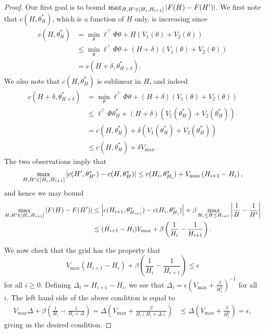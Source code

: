 \documentclass[11pt]{article}
\begin{document}
\begin{proof}
  Our first goal is to bound $\max_{H, H'\in [H_i, H_{i+1}]} \left\vert F(H) - F(H')\right\vert$. We first note that $c(H,\theta^*_H)$, which is a function of $H$ only, is increasing since 
\begin{align*}
  c(H,\theta^*_H)
  & =
    \min_{\theta}\ell^\top\Phi\theta + H(V_1(\theta)+V_2(\theta))\\
  &\leq
    \min_{\theta}\ell^\top\Phi\theta + (H+\delta)(V_1(\theta)+V_2(\theta))\\
  &=
  c(H+\delta,\theta^*_{H+\delta}).
\end{align*}
We also note that $c(H,\theta^*_H)$ is sublinear in $H$, and indeed 
\begin{align*}
  c(H+\delta,\theta^*_{H+\delta})
  &=
    \min_\theta \ell^\top\Phi\theta + (H+\delta)(V_1(\theta)+V_2(\theta))\\
  &\leq
    \ell^\top\Phi\theta^*_H + (H+\delta)(V_1(\theta^*_H)+V_2(\theta^*_H))\\
  &=
      c(H,\theta^*_{H}) + \delta(V_1(\theta^*_H)+V_2(\theta^*_H))\\
  &\leq c(H,\theta^*_{H}) + \delta V_{\max}.
\end{align*}
The two observations imply that
\begin{align*}
  \max_{H, H'\in [H_i, H_{i+1}]} \left\vert c(H',\theta^*_{H'}) - c(H,\theta^*_H)\right\vert
  \leq
  c(H_i,\theta^*_{H_i}) + V_{\max}\left( H_{i+1} - H_i\right),
\end{align*}
and hence we may bound
\begin{align*}
  \max_{H, H'\in [H_i, H_{i+1}]} \left\vert F(H) - F(H')\right\vert
  &\leq
   \left\vert c(H_{i+1}, \theta^*_{H_{i+1}}) - c(H_{i}, \theta^*_{H_i})\right\vert
    + \beta \max_{H_i\leq H\leq H_{i+1}}\left\vert\frac{1}{H} - \frac{1}{H'}\right\vert\\
  &\leq
    (H_{i+1}-H_i)V_{\max}
    + \beta\left(\frac{1}{H_{i}} - \frac{1}{H_{i+1}}\right).
\end{align*}


We now check that the grid has the property that
\[
  V_{\max}(H_{i+1}-H_i)
  + \beta\left(\frac{1}{H_{i}} - \frac{1}{H_{i+1}}\right) \leq \epsilon
\]
for all $i \geq 0$. Defining $\Delta_i = H_{i+1} - H_i$, we see that $\Delta_i = \epsilon \left( V_{\max} +\frac{\beta }{H_i^2} \right)^{-1}$ for all $i$. The left hand side of the above condition is equal to 
\begin{align*}
  V_{\max}\Delta
  + \beta\left(\frac{1}{H_{i}} - \frac{1}{H_{i}+\Delta}\right)
=
  \Delta \left( V_{\max} +\frac{\beta }{H_i(H_i + \Delta)} \right)
  &\leq
    \Delta \left( V_{\max} +\frac{\beta }{H_i^2} \right)
  = \epsilon,
\end{align*}
giving us the desired condition.


\end{proof}
\end{document}
